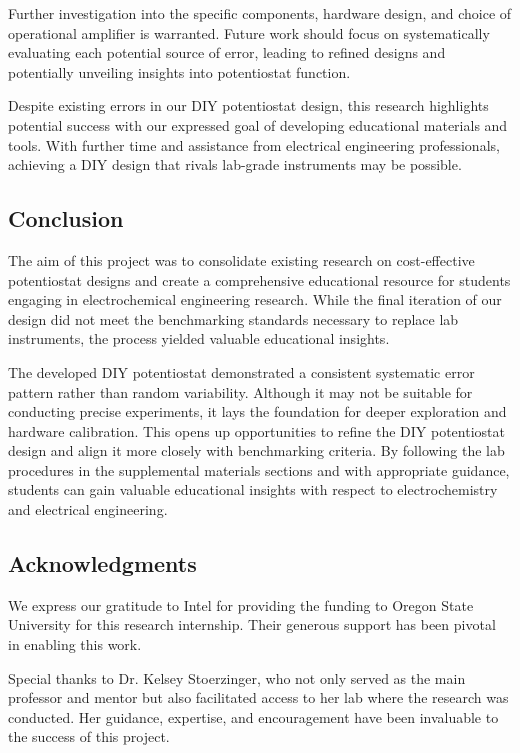 \documentclass{article}
\begin{document}
Further investigation into the specific components, hardware design, and choice of operational amplifier is warranted. Future work should focus on systematically evaluating each potential source of error, leading to refined designs and potentially unveiling insights into potentiostat function.



Despite existing errors in our DIY potentiostat design, this research highlights potential success with our expressed goal of developing educational materials and tools. With further time and assistance from electrical engineering professionals, achieving a DIY design that rivals lab-grade instruments may be possible.

\subsection*{Conclusion}
The aim of this project was to consolidate existing research on cost-effective potentiostat designs and create a comprehensive educational resource for students engaging in electrochemical engineering research. While the final iteration of our design did not meet the benchmarking standards necessary to replace lab instruments, the process yielded valuable educational insights.

The developed DIY potentiostat demonstrated a consistent systematic error pattern rather than random variability. Although it may not be suitable for conducting precise experiments, it lays the foundation for deeper exploration and hardware calibration. This opens up opportunities to refine the DIY potentiostat design and align it more closely with benchmarking criteria. By following the lab procedures in the supplemental materials sections and with appropriate guidance, students can gain valuable educational insights with respect to electrochemistry and electrical engineering.

\subsection*{Acknowledgments}

We express our gratitude to Intel for providing the funding to Oregon State University for this research internship. Their generous support has been pivotal in enabling this work.


Special thanks to Dr. Kelsey Stoerzinger, who not only served as the main professor and mentor but also facilitated access to her lab where the research was conducted. Her guidance, expertise, and encouragement have been invaluable to the success of this project.
\end{document}

